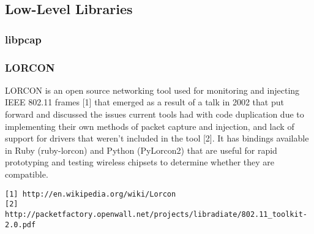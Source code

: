 \subsection{Low-Level Libraries}
\subsubsection{libpcap}
\subsubsection{LORCON}
LORCON is an open source networking tool used for monitoring and injecting IEEE 802.11 frames [1] that emerged as a result of a talk in 2002 that put forward and discussed the issues current tools had with code duplication due to implementing their own methods of packet capture and injection, and lack of support for drivers that weren’t included in the tool [2]. It has bindings available in Ruby (ruby-lorcon) and Python (PyLorcon2) that are useful for rapid prototyping and testing wireless chipsets to determine whether they are compatible.

\begin{verbatim}
[1] http://en.wikipedia.org/wiki/Lorcon
[2] http://packetfactory.openwall.net/projects/libradiate/802.11_toolkit-2.0.pdf
\end{verbatim}